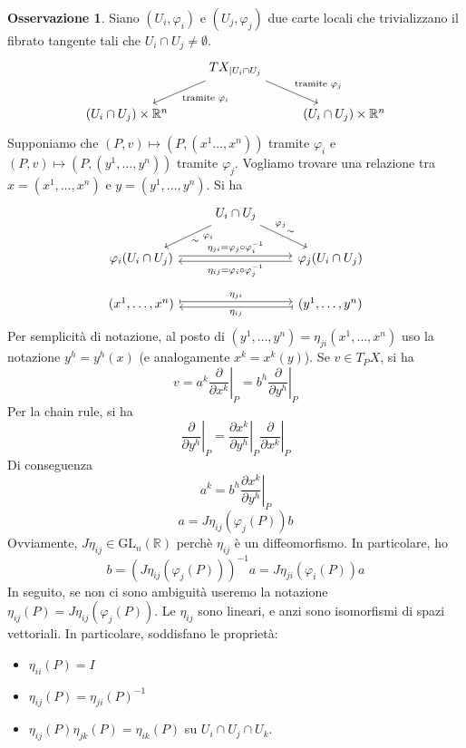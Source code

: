 \documentclass[a4paper,11pt]{article}
\theoremstyle{definition}
\newtheorem{osservazione}{Osservazione}[section]
\theoremstyle{theorem}
\begin{document}
\begin{osservazione}
	Siano $(U_i,\varphi_i)$ e $(U_j,\varphi_j)$ due carte locali che trivializzano il fibrato tangente tali che $U_i\cap U_j\neq\emptyset$.
	\[\begin{tikzcd}
	& TX_{|U_i\cap U_j}\arrow[dl, "\textrm{tramite }\varphi_i"]\arrow[dr, "\textrm{tramite }\varphi_j"] & \\
	\left(U_i\cap U_j\right)\times\mathbb{R}^n & & \left(U_i\cap U_j\right)\times\mathbb{R}^n
	\end{tikzcd}\]
	Supponiamo che $(P,v)\mapsto(P,(x^1\dots,x^n))$ tramite $\varphi_i$ e $(P,v)\mapsto(P,(y^1,\dots,y^n))$ tramite $\varphi_j$. Vogliamo trovare una relazione tra $x=(x^1,\dots,x^n)$ e $y=(y^1,\dots,y^n)$. Si ha
	\[\begin{tikzcd}
	& U_i\cap U_j\arrow[dl, "\sim", "\varphi_i" near start]\arrow[dr, "\sim", "\varphi_j" near start] & \\
	\varphi_i(U_i\cap U_j)\arrow[rr, shift left=0.5ex,  "\eta_{ji}=\varphi_j\circ\varphi_i^{-1}"] & & \arrow[ll, shift left=0.5ex, "\eta_{ij}=\varphi_i\circ\varphi_j^{-1}"] \varphi_j(U_i\cap U_j)\\
	(x^1,\dots,x^n) \arrow[rr, shift left=0.5ex, mapsto, "\eta_{ji}"] & &(y^1,\dots,y^n) \arrow[ll, shift left=0.5ex, mapsto, "\eta_{ij}"] 
	\end{tikzcd}\]
	Per semplicità di notazione, al posto di $(y^1,\dots,y^n)=\eta_{ji}(x^1,\dots,x^n)$ uso la notazione $y^h=y^h(x)$ (e analogamente $x^k=x^k(y)$). Se $v\in T_PX$, si ha
	\[v=a^k\left.\frac{\partial}{\partial x^k}\right|_P=b^h\left.\frac{\partial}{\partial y^h}\right|_P\]
	Per la chain rule, si ha
	\[\left.\frac{\partial}{\partial y^h}\right|_P=\left.\frac{\partial x^k}{\partial y^h}\right|_P\left.\frac{\partial}{\partial x^k}\right|_P\]
	Di conseguenza
	\[a^k=b^h\left.\frac{\partial x^k}{\partial y^h}\right|_P\]
	\[a=J\eta_{ij}(\varphi_j(P))b\]
	Ovviamente, $J\eta_{ij}\in\mathrm{GL}_n(\mathbb{R})$ perchè $\eta_{ij}$ è un diffeomorfismo. In particolare, ho
	\[b=\left(J\eta_{ij}(\varphi_j(P))\right)^{-1}a=J\eta_{ji}(\varphi_i(P))a\]
	In seguito, se non ci sono ambiguità useremo la notazione $\eta_{ij}(P)=J\eta_{ij}(\varphi_j(P))$.
	Le $\eta_{ij}$ sono lineari, e anzi sono isomorfismi di spazi vettoriali. In particolare, soddisfano le proprietà:
	\begin{itemize}
		\item $\eta_{ii}(P)=I$
		\item $\eta_{ij}(P)=\eta_{ji}(P)^{-1}$
		\item $\eta_{ij}(P)\eta_{jk}(P)=\eta_{ik}(P)$ su $U_i\cap U_j\cap U_k$.
	\end{itemize}
\end{osservazione}
\end{document}
